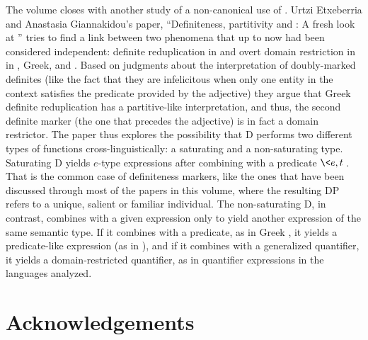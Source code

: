 \documentclass[output=paper]{langsci/langscibook}
\begin{document}
The volume closes with another study of a non-canonical use of . Urtzi Etxeberria and Anastasia Giannakidou’s paper, “Definiteness, partitivity and : A fresh look at ” tries to find a link between two phenomena that up to now had been considered independent: definite reduplication in  and overt domain restriction in  in , Greek,  and . Based on judgments about the interpretation of doubly-marked definites (like the fact that they are infelicitous when only one entity in the context satisfies the predicate provided by the adjective) they argue that Greek definite reduplication has a partitive-like interpretation, and thus, the second definite marker (the one that precedes the adjective) is in fact a domain restrictor. The paper thus explores the possibility that D performs two different types of functions cross-linguistically: a saturating and a non-saturating type. Saturating D yields $e$-type expressions after combining with a predicate $ \<e, t\> $. That is the common case of definiteness markers, like the ones that have been discussed through most of the papers in this volume, where the resulting DP refers to a unique, salient or familiar individual. The non-saturating D, in contrast, combines with a given expression only to yield another expression of the same semantic type. If it combines with a predicate, as in Greek , it yields a predicate-like expression (as in  ), and if it combines with a generalized quantifier, it yields a domain-restricted quantifier, as in quantifier expressions in the languages analyzed.

\section{Acknowledgements}
\end{document}
